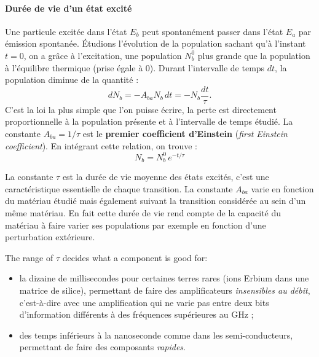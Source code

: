 \paragraph{Durée de vie d'un état excité}
Une particule excitée dans l'état $E_b$ peut spontanément passer dans l'état
$E_a$ par émission spontanée. Étudions l'évolution de la population sachant
qu'à l'instant $t=0$, on a grâce à l'excitation, une population $N_b^0$ plus
grande que la population à l'équilibre thermique (prise égale à 0). Durant
l'intervalle de temps $dt$, la population diminue de la quantité :
\[dN_b=-A_{ba}N_b\,dt=-N_b\frac{dt}{\tau}.\]
C'est la loi la plus simple que l'on puisse écrire, la perte est directement
proportionnelle à la population présente et à l'intervalle de temps étudié. La
constante $A_{ba}=1/\tau$ est le \textbf{premier coefficient d'Einstein}
(\textit{first Einstein coefficient}). En intégrant cette relation, on trouve :
\[\boxed{\,N_b=N_b^0\,e^{-t/\tau}\,}\]

\begin{definition}
  La constante $\tau$ est la durée de vie moyenne des états excités, c'est une
  caractéristique essentielle de chaque transition. La constante $A_{ba}$ varie
  en fonction du matériau étudié mais également suivant la transition
  considérée au sein d'un même matériau. En fait cette durée de vie rend compte
  de la capacité du matériau à faire varier ses populations par exemple en
  fonction d'une perturbation extérieure.
\end{definition}

The range of $\tau$ decides what a component is good for:
\begin{itemize}
  \item la dizaine de millisecondes pour certaines terres rares (ions Erbium
    dans une matrice de silice), permettant de faire des amplificateurs
    \emph{insensibles au débit}, c'est-à-dire avec une amplification qui ne
    varie pas entre deux bits d'information différents à des fréquences
    supérieures au GHz ;
  \item des temps inférieurs à la nanoseconde comme dans les semi-conducteurs,
    permettant de faire des composants \emph{rapides}.
\end{itemize}

